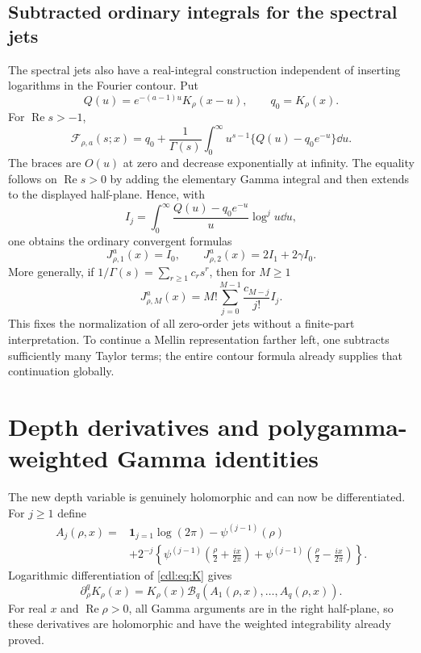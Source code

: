 \documentclass[11pt,letterpaper]{article}
\numberwithin{equation}{section}
\theoremstyle{definition}\newtheorem{definition}[theorem]{Definition}
\theoremstyle{remark}\newtheorem{remark}[theorem]{Remark}
\newcommand{\Rea}{\operatorname{Re}}\newcommand{\Ima}{\operatorname{Im}}
\newcommand{\F}{\mathcal F}\newcommand{\E}{\mathcal E}
\newcommand{\B}{\mathcal B}\newcommand{\PP}{\mathcal P}
\begin{document}
\subsection{Subtracted ordinary integrals for the spectral jets}
The spectral jets also have a real-integral construction independent of
inserting logarithms in the Fourier contour. Put
\[
 Q(u)=e^{-(a-1)u}K_\rho(x-u),\qquad q_0=K_\rho(x).
\]
For $\Rea s>-1$,
\begin{equation}\label{cdl:eq:subtracted}
 \F_{\rho,a}(s;x)=q_0+
 \frac1{\Gamma(s)}\int_0^\infty
 u^{s-1}\{Q(u)-q_0e^{-u}\}\dd u.
\end{equation}
The braces are $O(u)$ at zero and decrease exponentially at infinity.
The equality follows on $\Rea s>0$ by adding the elementary Gamma
integral and then extends to the displayed half-plane. Hence, with
\[
 I_j=\int_0^\infty\frac{Q(u)-q_0e^{-u}}u\log^j u\dd u,
\]
one obtains the ordinary convergent formulas
\begin{equation}\label{cdl:eq:Jsubtracted}
 J_{\rho,1}^a(x)=I_0,\qquad
 J_{\rho,2}^a(x)=2I_1+2\gamma I_0.
\end{equation}
More generally, if $1/\Gamma(s)=\sum_{r\ge1}c_rs^r$, then for $M\ge1$
\begin{equation}\label{cdl:eq:Jallsubtracted}
 J_{\rho,M}^a(x)=M!\sum_{j=0}^{M-1}\frac{c_{M-j}}{j!}I_j.
\end{equation}
This fixes the normalization of all zero-order jets without a finite-part
interpretation. To continue a Mellin representation farther left, one
subtracts sufficiently many Taylor terms; the entire contour formula
already supplies that continuation globally.

\section{Depth derivatives and polygamma-weighted Gamma identities}
\label{cdl:sec:depthjets}

The new depth variable is genuinely holomorphic and can now be
differentiated. For $j\ge1$ define
\begin{equation}\label{cdl:eq:Aj}
 \begin{split}
 A_j(\rho,x)={}&\mathbf1_{j=1}\log(2\pi)-\psi^{(j-1)}(\rho)\\
 &+2^{-j}\left\{
 \psi^{(j-1)}\left(\frac\rho2+\frac{ix}{2\pi}\right)+
 \psi^{(j-1)}\left(\frac\rho2-\frac{ix}{2\pi}\right)\right\}.
 \end{split}
\end{equation}
Logarithmic differentiation of \eqref{cdl:eq:K} gives
\begin{equation}\label{cdl:eq:Kdepthjets}
 \partial_\rho^qK_\rho(x)
 =K_\rho(x)\B_q(A_1(\rho,x),\ldots,A_q(\rho,x)).
\end{equation}
For real $x$ and $\Rea\rho>0$, all Gamma arguments are in the right
half-plane, so these derivatives are holomorphic and have the weighted
integrability already proved.
\end{document}
